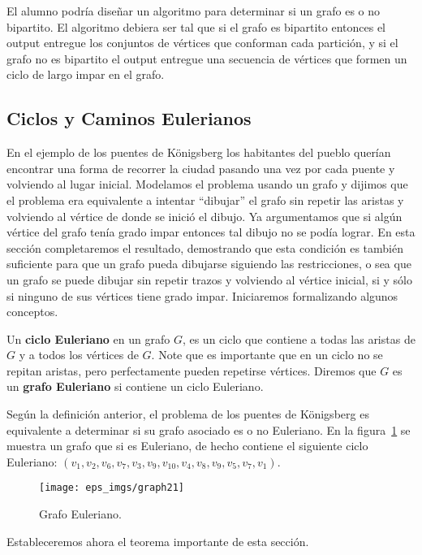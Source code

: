 El alumno podría diseñar un algoritmo para determinar si un grafo es o no bipartito.
El algoritmo debiera ser tal que si el grafo es bipartito entonces el output entregue los conjuntos de vértices que conforman cada partición, y si el grafo no es bipartito el output entregue una secuencia de vértices que formen un ciclo de largo impar en el grafo.

\subsection{Ciclos y Caminos Eulerianos}
En el ejemplo de los puentes de K\"onigsberg los habitantes del pueblo querían encontrar una forma de recorrer la ciudad pasando una vez por cada puente y volviendo al lugar inicial.
Modelamos el problema usando un grafo y dijimos que el problema era equivalente a intentar ``dibujar'' el grafo sin repetir las aristas y volviendo al vértice de donde se inició el dibujo.
Ya argumentamos que si algún vértice del grafo tenía grado impar entonces tal dibujo no se podía lograr.
En esta sección completaremos el resultado, demostrando que esta condición es también suficiente para que un grafo pueda dibujarse siguiendo las restricciones, o sea que un grafo se puede dibujar sin repetir trazos y volviendo al vértice inicial, si y sólo si ninguno de sus vértices tiene grado impar.
Iniciaremos formalizando algunos conceptos.


\begin{definicion}
Un {\bf ciclo Euleriano} en un grafo $G$, es un ciclo que contiene a todas las aristas de $G$ y a todos los vértices de $G$.
Note que es importante que en un ciclo no se repitan aristas, pero perfectamente pueden repetirse vértices.
Diremos que $G$ es un {\bf grafo Euleriano} si contiene un ciclo Euleriano.
\end{definicion}

Según la definición anterior, el problema de los puentes de K\"onigsberg es equivalente a determinar si su grafo asociado es o no Euleriano.
En la figura~\ref{fig:graph21} se muestra un grafo que si es Euleriano, de hecho contiene el siguiente ciclo Euleriano: $(v_1,v_2,v_6,v_7,v_3,v_9,v_{10},v_4,v_8,v_9,v_5,v_7,v_1)$.

\begin{figure}[h!]
\centering
\texttt{[image: eps\_imgs/graph21]}
\caption{Grafo Euleriano.}
\label{fig:graph21}
\end{figure}

Estableceremos ahora el teorema importante de esta sección.


